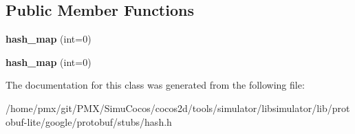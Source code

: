 \subsection*{Public Member Functions}
\begin{DoxyCompactItemize}
\item 
\mbox{\label{classgoogle_1_1protobuf_1_1hash__map_a0f35e335b4f6d67574f813714115e0cf}} 
{\bfseries hash\+\_\+map} (int=0)
\item 
\mbox{\label{classgoogle_1_1protobuf_1_1hash__map_a0f35e335b4f6d67574f813714115e0cf}} 
{\bfseries hash\+\_\+map} (int=0)
\end{DoxyCompactItemize}


The documentation for this class was generated from the following file\+:\begin{DoxyCompactItemize}
\item 
/home/pmx/git/\+P\+M\+X/\+Simu\+Cocos/cocos2d/tools/simulator/libsimulator/lib/protobuf-\/lite/google/protobuf/stubs/hash.\+h\end{DoxyCompactItemize}
